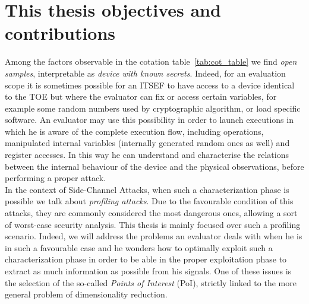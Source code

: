 \section{This thesis objectives and contributions}\label{sec:this_thesis_objectives}
Among the factors observable in the cotation table~\ref{tab:cot_table} we find \emph{open samples}, interpretable as \emph{device with known secrets}. Indeed, for an evaluation scope it is sometimes possible for an ITSEF to have access to a device identical to the TOE but where the evaluator can fix or access certain variables, for example some random numbers used by cryptographic algorithm, or load specific software. An evaluator may use this possibility in order to launch executions in which he is aware of the complete execution flow, including operations, manipulated internal variables (internally generated random ones as well) and register accesses. In this way he can understand and characterise the relations between the internal behaviour of the device and the physical observations, before performing a proper attack. \\

In the context of Side-Channel Attacks, when such a characterization phase is possible we talk about \emph{profiling attacks}. Due to the favourable condition of this attacks, they are commonly considered the most dangerous ones, allowing a sort of worst-case security analysis. This thesis is mainly focused over such a profiling scenario. Indeed, we will address the problems an evaluator deals with when he is in such a favourable case and he wonders how to optimally exploit such a characterization phase in order to be able in the proper exploitation phase to extract as much information as possible from his signals. One of these issues is the selection of the so-called \emph{Points of Interest} (PoI), strictly linked to the more general problem of dimensionality reduction.

